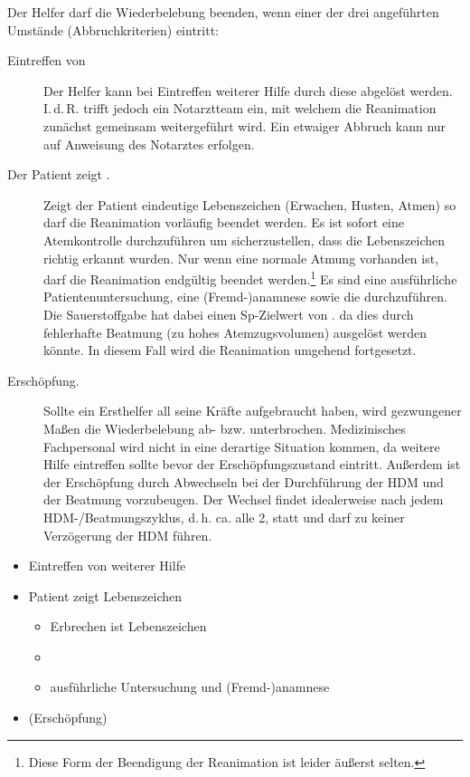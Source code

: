 {
Der Helfer darf die Wiederbelebung beenden, wenn einer der
drei angeführten Umstände (Abbruchkriterien) eintritt:

\begin{description}
  \item[Eintreffen von ] Der Helfer
  kann bei Eintreffen weiterer Hilfe durch diese abgelöst
  werden. I.\,d.\,R. trifft jedoch ein Notarztteam ein, mit
  welchem die Reanimation zunächst gemeinsam weitergeführt
  wird. Ein etwaiger Abbruch kann nur auf Anweisung des Notarztes
  erfolgen.
  \item[Der Patient zeigt .] 
  Zeigt der Patient eindeutige Lebenszeichen (Erwachen,
  Husten, Atmen) so darf die Reanimation vorläufig beendet
  werden. Es ist sofort eine Atemkontrolle
  durchzuführen um sicherzustellen, dass die
  Lebenszeichen richtig erkannt wurden. Nur
  wenn eine normale Atmung vorhanden ist,
  darf die Reanimation endgültig beendet
  werden.\footnote{Diese Form der Beendigung der Reanimation
  ist leider äußerst selten.} Es sind eine ausführliche
  Patientenuntersuchung, eine (Fremd-)anamnese sowie die
  {\TxMassVit} durchzuführen. Die Sauerstoffgabe hat dabei
  einen Sp-Zielwert von \PC*.
   da dies
  durch fehlerhafte Beatmung (zu hohes Atemzugsvolumen)
  ausgelöst werden könnte. In diesem Fall wird die
  Reanimation umgehend fortgesetzt.
  \item[Erschöpfung.] Sollte ein Ersthelfer all seine Kräfte
  aufgebraucht haben, wird gezwungener Maßen die
  Wiederbelebung ab- bzw.
  unterbrochen. Medizinisches Fachpersonal wird nicht in
  eine derartige Situation kommen, da weitere Hilfe
  eintreffen sollte bevor der Erschöpfungszustand eintritt.
  Außerdem ist der Erschöpfung durch Abwechseln bei der
  Durchführung der HDM und der Beatmung vorzubeugen. Der
  Wechsel findet idealerweise nach jedem
  HDM-/Beatmungszyklus, d.\,h. ca.
  alle 2\Min*, statt und darf zu keiner Verzögerung der HDM
  führen.
\end{description}

}{
\begin{itemize}
  \item Eintreffen von weiterer Hilfe
  \item Patient zeigt Lebenszeichen
  \begin{itemize}
    \item Erbrechen ist  Lebenszeichen
    \item {\TxMassVit}
    \item ausführliche Untersuchung und (Fremd-)anamnese
    \end{itemize}
  \item (Erschöpfung)
\end{itemize}
}{}{}{}




